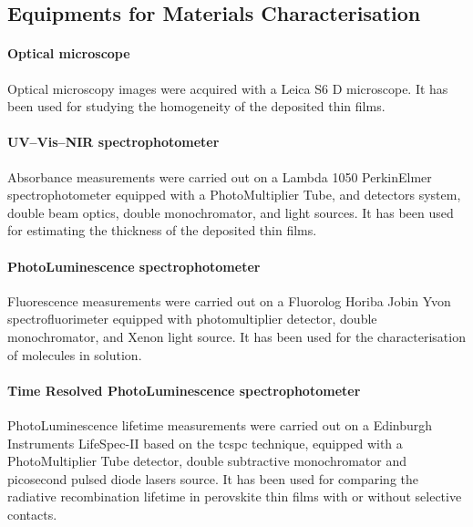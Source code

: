 	\subsection{Equipments for Materials Characterisation}

		\paragraph{Optical microscope}
		Optical microscopy images were acquired with a Leica S6 D microscope.
		It has been used for studying the homogeneity of the deposited thin films.

		\paragraph{UV--Vis--NIR spectrophotometer}
		Absorbance measurements were carried out on a Lambda 1050 PerkinElmer spectrophotometer equipped with a PhotoMultiplier Tube,  and  detectors system, double beam optics, double monochromator,  and  light sources.
		It has been used for estimating the thickness of the deposited thin films.

		\paragraph{PhotoLuminescence spectrophotometer}
		Fluorescence measurements were carried out on a Fluorolog Horiba Jobin Yvon spectrofluorimeter equipped with photomultiplier detector, double monochromator, and Xenon light source.
		It has been used for the characterisation of molecules in solution.

		\paragraph{Time Resolved PhotoLuminescence spectrophotometer}
		PhotoLuminescence lifetime measurements were carried out on a Edinburgh Instruments LifeSpec-II based on the \gls{tcspc} technique, equipped with a PhotoMultiplier Tube detector, double subtractive monochromator and picosecond pulsed diode lasers source.
		It has been used for comparing the radiative recombination lifetime in perovskite thin films with or without selective contacts.

